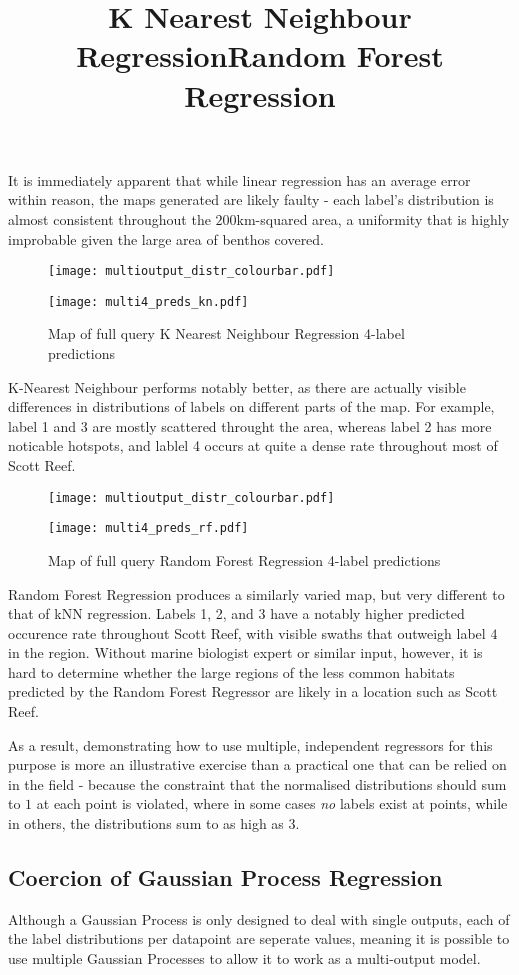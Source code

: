 It is immediately apparent that while linear regression has an average error within reason, the maps generated are likely faulty - each label's distribution is almost consistent throughout the $200$km-squared area, a uniformity that is highly improbable given the large area of benthos covered.

\begin{figure}[H]
    \title{\large{\textbf{K Nearest Neighbour Regression}}}
    \centerline{\texttt{[image: multioutput\_distr\_colourbar.pdf]}}
    \centerline{\texttt{[image: multi4\_preds\_kn.pdf]}}
    \caption{Map of full query K Nearest Neighbour Regression 4-label predictions}
    \label{fig:multi4_rf}
\end{figure}

K-Nearest Neighbour performs notably better, as there are actually visible differences in distributions of labels on different parts of the map. For example, label 1 and 3 are mostly scattered throught the area, whereas label 2 has more noticable hotspots, and lablel 4 occurs at quite a dense rate throughout most of Scott Reef.

\begin{figure}[H]
    \title{\large{\textbf{Random Forest Regression}}}
    \centerline{\texttt{[image: multioutput\_distr\_colourbar.pdf]}}
    \centerline{\texttt{[image: multi4\_preds\_rf.pdf]}}
    \caption{Map of full query Random Forest Regression 4-label predictions}
    \label{fig:multi4_rf}
\end{figure}

Random Forest Regression produces a similarly varied map, but very different to that of kNN regression. Labels 1, 2, and 3 have a notably higher predicted occurence rate throughout Scott Reef, with visible swaths that outweigh label $4$ in the region. Without marine biologist expert or similar input, however, it is hard to determine whether the large regions of the less common habitats predicted by the Random Forest Regressor are likely in a location such as Scott Reef.

As a result, demonstrating how to use multiple, independent regressors for this purpose is more an illustrative exercise than a practical one that can be relied on in the field - because the constraint that the normalised distributions should sum to $1$ at each point is violated, where in some cases \textit{no} labels exist at points, while in others, the distributions sum to as high as $3$.

\subsection{Coercion of Gaussian Process Regression}
Although a Gaussian Process is only designed to deal with single outputs, each of the label distributions per datapoint are seperate values, meaning it is possible to use multiple Gaussian Processes to allow it to work as a multi-output model. 

